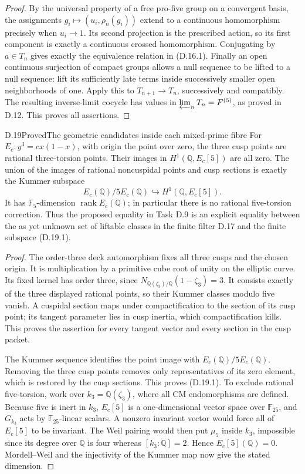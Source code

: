 \begin{proof}
By the universal property of a free pro-five
group on a convergent basis, the assignments
\(g_i\mapsto(u_i,\rho_n(g_i))\) extend to a
continuous homomorphism precisely when
\(u_i\to1\). Its second projection is the
prescribed action, so its first component is
exactly a continuous crossed homomorphism.
Conjugating by \(a\in T_n\) gives exactly
the equivalence relation in (D.16.1).
Finally an open continuous surjection of
compact groups allows a null sequence to be
lifted to a null sequence: lift its sufficiently
late terms inside successively smaller open
neighborhoods of one. Apply this to
\(T_{n+1}\to T_n\), successively and compatibly.
The resulting inverse-limit cocycle has values
in \(\varprojlim_nT_n=F^{(5)}\), as proved in
D.12. This proves all assertions.
\end{proof}

\begin{statement}{D.19}{Proved}{The geometric candidates inside each mixed-prime fibre}
For \(E_c:y^3=cx(1-x)\), with origin the point over
zero, the three cusp points are rational
three-torsion points. Their images in
\(H^1(\mathbb Q,E_c[5])\) are all zero.
The union of the images of rational noncuspidal
points and cusp sections is exactly the Kummer
subspace
\[
 E_c(\mathbb Q)/5E_c(\mathbb Q)
          \hookrightarrow H^1(\mathbb Q,E_c[5]).       \tag{D.19.1}
\]
It has \(\mathbb F_5\)-dimension
\(\operatorname{rank}E_c(\mathbb Q)\); in particular
there is no rational five-torsion correction.
Thus the proposed equality in Task D.9 is an
explicit equality between the as yet unknown
set of liftable classes in the finite filter
D.17 and the finite subspace (D.19.1).
\end{statement}
\begin{proof}
The order-three deck automorphism fixes all three
cusps and the chosen origin. It is multiplication
by a primitive cube root of unity on the elliptic
curve. Its fixed kernel has order three, since
\(N_{\mathbb Q(\zeta_3)/\mathbb Q}(1-\zeta_3)=3\).
It consists exactly of the three displayed
rational points, so their Kummer classes modulo
five vanish. A cuspidal section maps under
compactification to the section of its cusp
point; its tangent parameter lies in cusp
inertia, which compactification kills. This
proves the assertion for every tangent vector
and every section in the cusp packet.

The Kummer sequence identifies the point image
with \(E_c(\mathbb Q)/5E_c(\mathbb Q)\).
Removing the three cusp points removes only
representatives of its zero element, which is
restored by the cusp sections. This proves
(D.19.1). To exclude rational five-torsion,
work over \(k_3=\mathbb Q(\zeta_3)\), where all CM
endomorphisms are defined. Because five is
inert in \(k_3\), \(E_c[5]\) is a one-dimensional
vector space over \(\mathbb F_{25}\), and
\(G_{k_3}\) acts by \(\mathbb F_{25}\)-linear
scalars. A nonzero invariant vector would
force all of \(E_c[5]\) to be invariant.
The Weil pairing would then put \(\mu_5\)
inside \(k_3\), impossible since its degree
over \(\mathbb Q\) is four whereas
\([k_3:\mathbb Q]=2\). Hence
\(E_c[5](\mathbb Q)=0\). Mordell--Weil and
the injectivity of the Kummer map now give
the stated dimension.
\end{proof}

